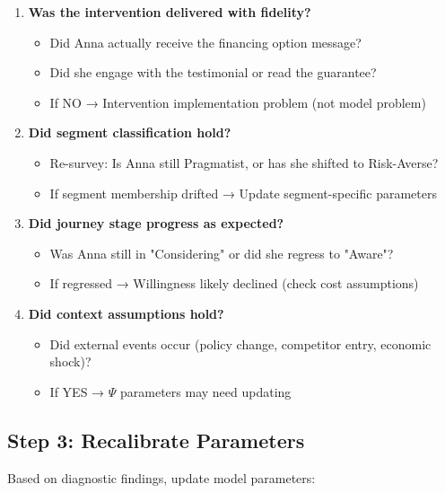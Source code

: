 \begin{enumerate}

\item \textbf{Was the intervention delivered with fidelity?}
   \begin{itemize}[nosep]
       \item Did Anna actually receive the financing option message?
       \item Did she engage with the testimonial or read the guarantee?
       \item If NO → Intervention implementation problem (not model problem)
   \end{itemize}

\item \textbf{Did segment classification hold?}
   \begin{itemize}[nosep]
       \item Re-survey: Is Anna still Pragmatist, or has she shifted to Risk-Averse?
       \item If segment membership drifted → Update segment-specific parameters
   \end{itemize}

\item \textbf{Did journey stage progress as expected?}
   \begin{itemize}[nosep]
       \item Was Anna still in "Considering" or did she regress to "Aware"?
       \item If regressed → Willingness likely declined (check cost assumptions)
   \end{itemize}

\item \textbf{Did context assumptions hold?}
   \begin{itemize}[nosep]
       \item Did external events occur (policy change, competitor entry, economic shock)?
       \item If YES → $\Psi$ parameters may need updating
   \end{itemize}

\end{enumerate}

\subsection{Step 3: Recalibrate Parameters}

Based on diagnostic findings, update model parameters:


